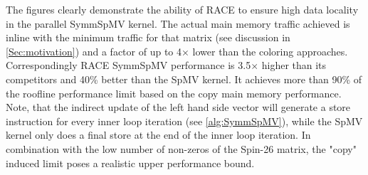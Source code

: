 The figures clearly demonstrate the ability of \acrshort{RACE} to ensure high data locality in the parallel \acrshort{SymmSpMV} kernel. The actual main memory traffic achieved is inline with the minimum traffic for that matrix (see discussion in \cref{Sec:motivation}) and a factor of up to 4$\times$ lower than the coloring approaches. Correspondingly \acrshort{RACE} \acrshort{SymmSpMV} performance is 3.5$\times$ higher than its competitors and 40\% better than the \acrshort{SpMV} kernel. It achieves more than 90\% of the roofline performance limit based on the copy main memory performance. Note, that the indirect update of the left hand side vector will generate a store instruction for every inner loop iteration (see \cref{alg:SymmSpMV}), while the \acrshort{SpMV} kernel only does a final store at the end of the inner loop iteration. In combination with the low number of non-zeros of the Spin-26 matrix, the "copy" induced limit poses a realistic upper performance bound.  
%
